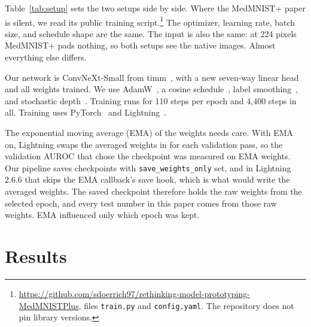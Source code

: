 \documentclass[conference]{IEEEtran}
\begin{document}
Table~\ref{tab:setup} sets the two setups side by side. Where the MedMNIST+ paper is silent, we read its public training script.\footnote{\url{https://github.com/sdoerrich97/rethinking-model-prototyping-MedMNISTPlus}, files \texttt{train.py} and \texttt{config.yaml}. The repository does not pin library versions.} The optimizer, learning rate, batch size, and schedule shape are the same. The input is also the same: at 224 pixels MedMNIST+ pads nothing, so both setups see the native images. Almost everything else differs.

Our network is ConvNeXt-Small from timm~\cite{wightman2019timm}, with a new seven-way linear head and all weights trained. We use AdamW~\cite{loshchilov2019adamw}, a cosine schedule~\cite{loshchilov2017sgdr}, label smoothing~\cite{szegedy2016inception}, and stochastic depth~\cite{huang2016stochasticdepth}. Training runs for 110 steps per epoch and 4,400 steps in all. Training uses PyTorch~\cite{paszke2019pytorch} and Lightning~\cite{lightning}.

The exponential moving average (EMA) of the weights needs care. With EMA on, Lightning swaps the averaged weights in for each validation pass, so the validation AUROC that chose the checkpoint was measured on EMA weights. Our pipeline saves checkpoints with \texttt{save\_weights\_only} set, and in Lightning 2.6.6 that skips the EMA callback's save hook, which is what would write the averaged weights. The saved checkpoint therefore holds the raw weights from the selected epoch, and every test number in this paper comes from those raw weights. EMA influenced only which epoch was kept.

\section{Results}
\end{document}
